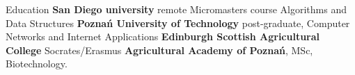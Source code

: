 \begin{rubric}{Education}
\entry*[2022 -- current]\textbf{San Diego university}
    remote Micromasters course\newline
    Algorithms and Data Structures
\entry*[2010 -- 2011]\textbf{Poznań University of Technology}
    post-graduate,\newline
    Computer Networks and Internet Applications
\entry*[2005]\textbf{Edinburgh Scottish Agricultural College}\newline
    Socrates/Erasmus
\entry*[2001 -- 2006]\textbf{Agricultural Academy of Poznań},
    MSc,\newline
    Biotechnology.
\end{rubric}
